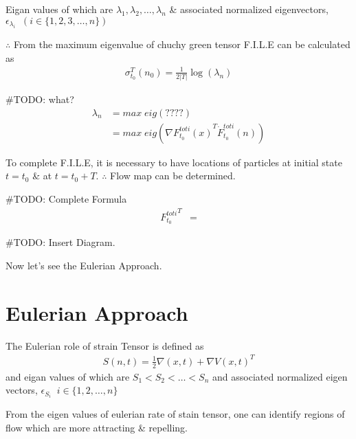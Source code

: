 \documentclass[../report.tex]{subfiles}
\begin{document}
Eigan values of which are \(\lambda_1, \lambda_2, \dots, \lambda_n\) \& associated normalized eigenvectors, \(\epsilon_{\lambda_i}\;\; (i \in \{1, 2, 3, \dots, n\})\)

\(\therefore\) From the maximum eigenvalue of chuchy green tensor F.I.L.E can be calculated as
\begin{equation}
  \begin{aligned}
    \sigma_{t_0}^T (n_0) = \frac{1}{2|T|} \log(\lambda_n)
  \end{aligned}
\end{equation}

\#TODO: what?
\begin{equation}
  \begin{aligned}
    \lambda_n &= max\; eig (????) \\
    &= max\; eig(\nabla {F_{t_0}^{toti}(x)}^T \dot F_{t_0}^{toti}(n))
  \end{aligned}
\end{equation}

To complete F.I.L.E, it is necessary to have locations of particles at initial state \(t = t_0\) \& at \(t = t_0 + T\). \(\therefore\) Flow map can be determined.

\#TODO: Complete Formula
\begin{equation}
  \begin{aligned}
    {F_{t_0}^{toti}}^T &=
  \end{aligned}
\end{equation}

\#TODO: Insert Diagram.

Now let's see the Eulerian Approach. \par

\section{Eulerian Approach}
The Eulerian role of strain Tensor is defined as
\begin{equation}
  \begin{aligned}
    S(n, t) = \frac{1}{2}{\nabla(x, t) + \nabla V(x, t)^T}
  \end{aligned}
\end{equation}
and eigan values of which are \(S_1 < S_2 < \dots < S_n\) and associated normalized eigen vectors, \(\epsilon_{S_i}\;\; i \in \{1, 2, \dots, n\}\) \par

From the eigen values of eulerian rate of stain tensor, one can identify regions of flow which are more attracting \& repelling. \par
\end{document}
